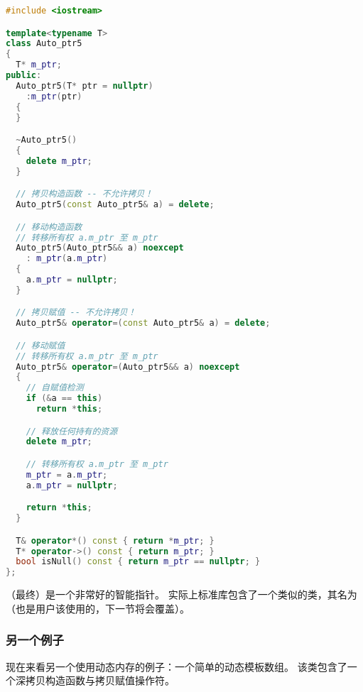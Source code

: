 \documentclass[../../LearnCpp.tex]{subfiles}
\begin{document}
\begin{lstlisting}[language=C++]
#include <iostream>

template<typename T>
class Auto_ptr5
{
  T* m_ptr;
public:
  Auto_ptr5(T* ptr = nullptr)
    :m_ptr(ptr)
  {
  }

  ~Auto_ptr5()
  {
    delete m_ptr;
  }

  // 拷贝构造函数 -- 不允许拷贝！
  Auto_ptr5(const Auto_ptr5& a) = delete;

  // 移动构造函数
  // 转移所有权 a.m_ptr 至 m_ptr
  Auto_ptr5(Auto_ptr5&& a) noexcept
    : m_ptr(a.m_ptr)
  {
    a.m_ptr = nullptr;
  }

  // 拷贝赋值 -- 不允许拷贝！
  Auto_ptr5& operator=(const Auto_ptr5& a) = delete;

  // 移动赋值
  // 转移所有权 a.m_ptr 至 m_ptr
  Auto_ptr5& operator=(Auto_ptr5&& a) noexcept
  {
    // 自赋值检测
    if (&a == this)
      return *this;

    // 释放任何持有的资源
    delete m_ptr;

    // 转移所有权 a.m_ptr 至 m_ptr
    m_ptr = a.m_ptr;
    a.m_ptr = nullptr;

    return *this;
  }

  T& operator*() const { return *m_ptr; }
  T* operator->() const { return m_ptr; }
  bool isNull() const { return m_ptr == nullptr; }
};
\end{lstlisting}

 （最终）是一个非常好的智能指针。
实际上标准库包含了一个类似的类，其名为 （也是用户该使用的，下一节将会覆盖）。

\subsubsection*{另一个例子}

现在来看另一个使用动态内存的例子：一个简单的动态模板数组。
该类包含了一个深拷贝构造函数与拷贝赋值操作符。
\end{document}
